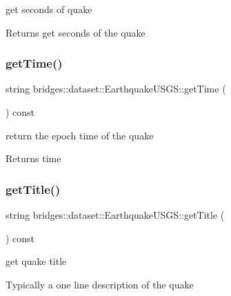 get seconds of quake 

\begin{DoxyReturn}{Returns}
get seconds of the quake 
\end{DoxyReturn}
\mbox{\label{classbridges_1_1dataset_1_1_earthquake_u_s_g_s_a9078bfa4e954f78a3cf6e4a87747272b}} 
\subsubsection{\texorpdfstring{get\+Time()}{getTime()}}
{\footnotesize\ttfamily string bridges\+::dataset\+::\+Earthquake\+U\+S\+G\+S\+::get\+Time (\begin{DoxyParamCaption}{ }\end{DoxyParamCaption}) const\hspace{0.3cm}{\ttfamily [inline]}}



return the epoch time of the quake 

\begin{DoxyReturn}{Returns}
time 
\end{DoxyReturn}
\mbox{\label{classbridges_1_1dataset_1_1_earthquake_u_s_g_s_a3e63533e53a119ceeb98c97ff35abc4a}} 
\subsubsection{\texorpdfstring{get\+Title()}{getTitle()}}
{\footnotesize\ttfamily string bridges\+::dataset\+::\+Earthquake\+U\+S\+G\+S\+::get\+Title (\begin{DoxyParamCaption}{ }\end{DoxyParamCaption}) const\hspace{0.3cm}{\ttfamily [inline]}}



get quake title 

Typically a one line description of the quake

